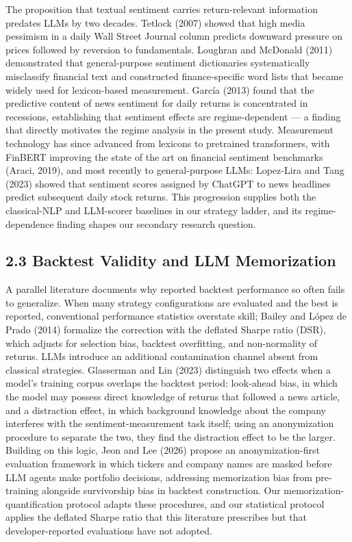 \documentclass[
  12pt,
]{article}
\begin{document}
The proposition that textual sentiment carries return-relevant
information predates LLMs by two decades. Tetlock (2007) showed that
high media pessimism in a daily Wall Street Journal column predicts
downward pressure on prices followed by reversion to fundamentals.
Loughran and McDonald (2011) demonstrated that general-purpose sentiment
dictionaries systematically misclassify financial text and constructed
finance-specific word lists that became widely used for lexicon-based
measurement. García (2013) found that the predictive content of news
sentiment for daily returns is concentrated in recessions, establishing
that sentiment effects are regime-dependent --- a finding that directly
motivates the regime analysis in the present study. Measurement
technology has since advanced from lexicons to pretrained transformers,
with FinBERT improving the state of the art on financial sentiment
benchmarks (Araci, 2019), and most recently to general-purpose LLMs:
Lopez-Lira and Tang (2023) showed that sentiment scores assigned by
ChatGPT to news headlines predict subsequent daily stock returns. This
progression supplies both the classical-NLP and LLM-scorer baselines in
our strategy ladder, and its regime-dependence finding shapes our
secondary research question.

\hypertarget{backtest-validity-and-llm-memorization}{%
\subsection{2.3 Backtest Validity and LLM
Memorization}\label{backtest-validity-and-llm-memorization}}

A parallel literature documents why reported backtest performance so
often fails to generalize. When many strategy configurations are
evaluated and the best is reported, conventional performance statistics
overstate skill; Bailey and López de Prado (2014) formalize the
correction with the deflated Sharpe ratio (DSR), which adjusts for
selection bias, backtest overfitting, and non-normality of returns. LLMs
introduce an additional contamination channel absent from classical
strategies. Glasserman and Lin (2023) distinguish two effects when a
model's training corpus overlaps the backtest period: look-ahead bias,
in which the model may possess direct knowledge of returns that followed
a news article, and a distraction effect, in which background knowledge
about the company interferes with the sentiment-measurement task itself;
using an anonymization procedure to separate the two, they find the
distraction effect to be the larger. Building on this logic, Jeon and
Lee (2026) propose an anonymization-first evaluation framework in which
tickers and company names are masked before LLM agents make portfolio
decisions, addressing memorization bias from pre-training alongside
survivorship bias in backtest construction. Our
memorization-quantification protocol adapts these procedures, and our
statistical protocol applies the deflated Sharpe ratio that this
literature prescribes but that developer-reported evaluations have not
adopted.
\end{document}
